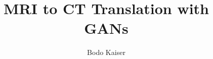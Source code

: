 \documentclass[
	a4paper,
	abstracton,
	emulatestandardclasses
]{scrartcl}
\title{MRI to CT Translation with GANs}
\author[1]{Bodo Kaiser}
\affil[1]{\textit{bodo.kaiser@physik.uni-muenchen.de}}
\begin{document}
\makeatletter
\maketitle

\makeatother








\clearpage
\printbibliography{}
\end{document}
